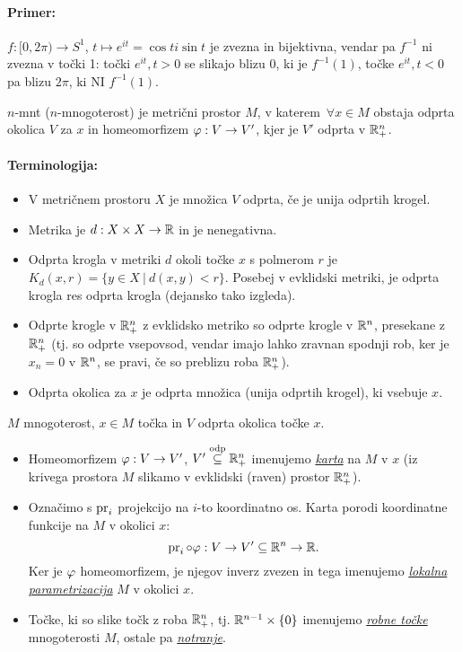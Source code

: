 \paragraph{Primer:}
$f : [0,2\pi) \to S^1$, $t \mapsto e^{it} = \cos t  i\sin t$ je zvezna in bijektivna, vendar pa $f^{-1}$ ni zvezna v to\v cki 1:
to\v cki $e^{it}, t > 0$ se slikajo blizu $0$, ki je $f^{-1}(1)$, to\v cke $e^{it}, t < 0$ pa blizu $2\pi$, ki NI $f^{-1}(1)$.
\pagebreak
\begin{defin}
	$n$-mnt ($n$-mnogoterost) je metri\v cni prostor $M$, v katerem\ $\forall x \in M$ obstaja odprta okolica $V$ za $x$ in
	homeomorfizem $\varphi : V \to V'$, kjer je $V'$ odprta v $\mathbb{R}^n_+$.
\end{defin}

\paragraph{Terminologija:}
\begin{itemize}
	\item{V metri\v cnem prostoru $X$ je mno\v zica $V$ odprta, \v ce je unija odprtih krogel.}
	\item{Metrika je $d : X \times X \to \mathbb{R}$ in je nenegativna.}
	\item{Odprta krogla v metriki $d$ okoli to\v cke $x$ s polmerom $r$ je $K_d(x,r) = \{y \in X\ |\ d(x,y) < r\}$. Posebej v
		evklidski metriki, je odprta krogla res odprta krogla (dejansko tako izgleda).}
	\item{Odprte krogle v $\mathbb{R}^n_+$ z evklidsko metriko so odprte krogle v $\mathbb{R}^n$, presekane z $\mathbb{R}^n_+$ (tj. so odprte vsepovsod,
		vendar imajo lahko zravnan spodnji rob, ker je $x_n = 0$ v $\mathbb{R}^n$, se pravi, \v ce so preblizu roba $\mathbb{R}^n_+$).}
	\item{Odprta okolica za $x$ je odprta mno\v zica (unija odprtih krogel), ki vsebuje $x$.}	
\end{itemize}

\begin{defin}
	$M$ mnogoterost, $x \in M$ to\v cka in $V$ odprta okolica to\v cke $x$.
	\begin{itemize}
		\item{Homeomorfizem $\varphi : V \to V'$, $V' \stackrel{\text{odp}}{\subseteq} \mathbb{R}^n_+$ imenujemo \underline{\emph{karta}} na $M$ v $x$ (iz krivega prostora $M$
			slikamo v evklidski (raven) prostor $\mathbb{R}^n_+$).}
		\item{Ozna\v cimo s $\operatorname{pr}_i$ projekcijo na $i$-to koordinatno os. Karta porodi koordinatne funkcije na $M$ v okolici $x$:
			\[
				\operatorname{pr}_i \circ \varphi : V \to V' \subseteq \mathbb{R}^n \to \mathbb{R}.
			\]
			Ker je $\varphi$ homeomorfizem, je njegov inverz zvezen in tega imenujemo \underline{\emph{lokalna parametrizacija}}
			$M$ v okolici $x$.}
		\item{To\v cke, ki so slike to\v ck z roba $\mathbb{R}^n_+$, tj. $\mathbb{R}^{n-1} \times \{0\}$ imenujemo \underline{\emph{robne to\v cke}}
			mnogoterosti $M$, ostale pa \underline{\emph{notranje}}.}
	\end{itemize}
\end{defin}

